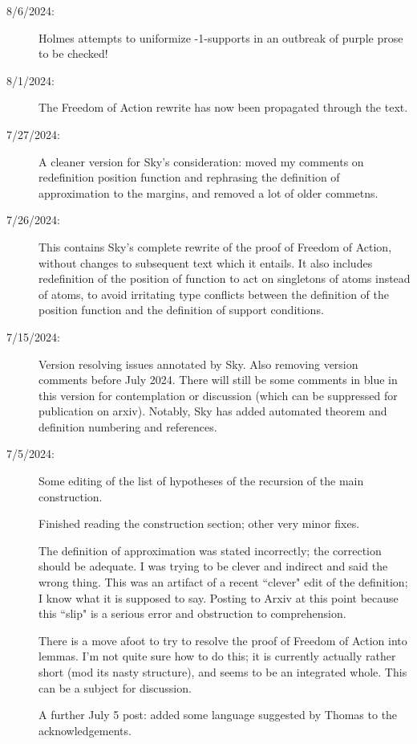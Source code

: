 \documentclass[112pt]{article}
\theoremstyle{definition}
\theoremstyle{remark}
\newcommand{\hsuggest}[1]{{\color{magenta}#1}}
\begin{document}
\begin{description}
\item[8/6/2024:]  Holmes attempts to uniformize -1-supports in an outbreak of \hsuggest{purple prose} to be checked!

\item[8/1/2024:]  The Freedom of Action rewrite has now been propagated through the text.

\item[7/27/2024:]  A cleaner version for Sky's consideration:  moved my comments on redefinition position function and rephrasing the definition of approximation to the margins, and removed a lot of older commetns.

\item[7/26/2024:]  This contains Sky's complete rewrite of the proof of Freedom of Action, without changes to subsequent text which it entails.  It also includes
redefinition of the position of function to act on singletons of atoms instead of atoms, to avoid irritating type conflicts between the definition of the position function
and the definition of support conditions.

\item[7/15/2024:]  Version resolving issues annotated by Sky.  Also removing version comments before July 2024.  There will still be some comments in blue in this version for contemplation or discussion (which can be suppressed for publication on arxiv).  Notably, Sky has added automated theorem and definition numbering and references.

\item[7/5/2024:]  Some editing of the list of hypotheses of the recursion of the main construction.

Finished reading the construction section;  other very minor fixes.

The definition of approximation was stated incorrectly;  the correction should be adequate.  I was trying to be clever and indirect and said the wrong thing.  This was an artifact of a recent ``clever" edit of the definition; I know what it is supposed to say.  Posting to Arxiv at this point because this ``slip" is a serious error and obstruction to comprehension.

There is a move afoot to try to resolve the proof of Freedom of Action into lemmas.  I'm not quite sure how to do this;  it is currently actually rather short (mod its nasty structure), and seems to be an integrated whole.  This can be a subject for discussion.

A further July 5 post: added some language suggested by Thomas to the acknowledgements.


\end{description}
\end{document}
